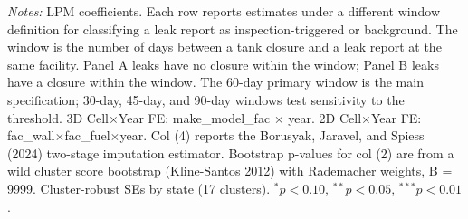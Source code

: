 \begin{table}[htbp]
\begin{tabular}{lccccc}
\end{tabular}
\begin{minipage}{\linewidth}
\small
\textit{Notes:} LPM coefficients. Each row reports estimates under a different window definition for classifying a leak report as inspection-triggered or background. The window is the number of days between a tank closure and a leak report at the same facility. Panel A leaks have no closure within the window; Panel B leaks have a closure within the window. The 60-day primary window is the main specification; 30-day, 45-day, and 90-day windows test sensitivity to the threshold. 3D Cell$\times$Year FE: make\_model\_fac $\times$ year. 2D Cell$\times$Year FE: fac\_wall$\times$fac\_fuel$\times$year. Col (4) reports the Borusyak, Jaravel, and Spiess (2024) two-stage imputation estimator. Bootstrap p-values for col (2) are from a wild cluster score bootstrap (Kline-Santos 2012) with Rademacher weights, B = 9999. Cluster-robust SEs by state (17 clusters). $^{*}p<0.10$, $^{**}p<0.05$, $^{***}p<0.01$.
\end{minipage}
\end{table}
